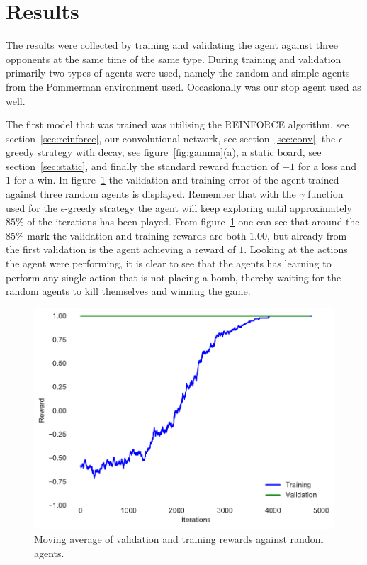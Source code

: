 \section{Results}
\label{sec:results}

The results were collected by training and validating the agent against three opponents at the same time of the same type. During training and validation primarily two types of agents were used, namely the random and simple agents from the Pommerman environment used. Occasionally was our stop agent used as well.

The first model that was trained was utilising the REINFORCE algorithm, see section~\ref{sec:reinforce}, our convolutional network, see section~\ref{sec:conv}, the $\epsilon$-greedy strategy with decay, see figure~\ref{fig:gamma}(a), a static board, see section~\ref{sec:static}, and finally the standard reward function of $-1$ for a loss and $1$ for a win. In figure~\ref{fig:resultsrandom} the validation and training error of the agent trained against three random agents is displayed. Remember that with the $\gamma$ function used for the $\epsilon$-greedy strategy the agent will keep exploring until approximately $85\%$ of the iterations has been played. From figure~\ref{fig:resultsrandom} one can see that around the $85\%$ mark the validation and training rewards are both $1.00$, but already from the first validation is the agent achieving a reward of $1$. Looking at the actions the agent were performing, it is clear to see that the agents has learning to perform any single action that is not placing a bomb, thereby waiting for the random agents to kill themselves and winning the game.

\begin{figure}[htb]
    \centerline{\includegraphics[width=1.0\linewidth]{pommerman/plots/random_train_val.pdf}}
    \caption{Moving average of validation and training rewards against random agents.}\label{fig:resultsrandom}
\end{figure}


